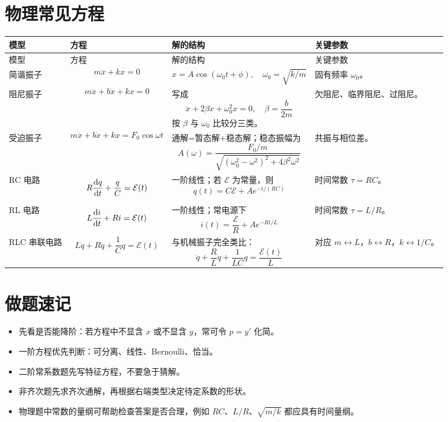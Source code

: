 \section{物理常见方程}

\begin{longtable}{p{}p{}p{}p{}}
\toprule
模型 & 方程 & 解的结构 & 关键参数 \\
\midrule
\endfirsthead
\toprule
模型 & 方程 & 解的结构 & 关键参数 \\
\midrule
\endhead
\bottomrule
\endfoot
简谐振子 & 
\[
 m\ddot x+kx=0
\]
 & 
\[
 x=A\cos(\omega_0 t+\phi),\quad \omega_0=\sqrt{k/m}
\]
 & 固有频率 $\omega_0$。 \\

阻尼振子 & 
\[
 m\ddot x+b\dot x+kx=0
\]
 & 写成
\[
 \ddot x+2\beta \dot x+\omega_0^2x=0,
\quad \beta=\frac{b}{2m}
\]
按 $\beta$ 与 $\omega_0$ 比较分三类。 & 欠阻尼、临界阻尼、过阻尼。 \\

受迫振子 & 
\[
 m\ddot x+b\dot x+kx=F_0\cos \omega t
\]
 & 通解=暂态解+稳态解；稳态振幅为
\[
 A(\omega)=\frac{F_0/m}{\sqrt{(\omega_0^2-\omega^2)^2+4\beta^2\omega^2}}
\]
 & 共振与相位差。 \\

RC 电路 & 
\[
 R\dv{q}{t}+\frac{q}{C}=\mathcal{E}(t)
\]
 & 一阶线性；若 $\mathcal{E}$ 为常量，则
\[
 q(t)=C\mathcal{E}+Ae^{-t/(RC)}
\]
 & 时间常数 $\tau=RC$。 \\

RL 电路 & 
\[
 L\dv{i}{t}+Ri=\mathcal{E}(t)
\]
 & 一阶线性；常电源下
\[
 i(t)=\frac{\mathcal{E}}{R}+Ae^{-Rt/L}
\]
 & 时间常数 $\tau=L/R$。 \\

RLC 串联电路 & 
\[
 L\ddot q+R\dot q+\frac{1}{C}q=\mathcal{E}(t)
\]
 & 与机械振子完全类比：
\[
 \ddot q+\frac{R}{L}\dot q+\frac{1}{LC}q=\frac{\mathcal{E}(t)}{L}
\]
 & 对应 $m\leftrightarrow L$，$b\leftrightarrow R$，$k\leftrightarrow 1/C$。 \\
\end{longtable}

\section{做题速记}

\begin{itemize}
  \item 先看是否能降阶：若方程中不显含 $x$ 或不显含 $y$，常可令 $p=y'$ 化简。
  \item 一阶方程优先判断：可分离、线性、Bernoulli、恰当。
  \item 二阶常系数题先写特征方程，不要急于猜解。
  \item 非齐次题先求齐次通解，再根据右端类型决定待定系数的形状。
  \item 物理题中常数的量纲可帮助检查答案是否合理，例如 $RC$、$L/R$、$\sqrt{m/k}$ 都应具有时间量纲。
\end{itemize}
